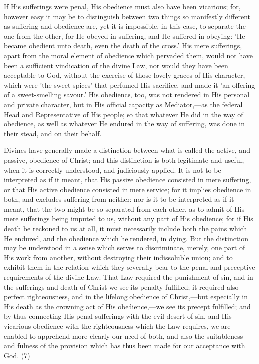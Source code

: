 \documentclass[
]{book}
\begin{document}
If His sufferings were penal, His obedience must also have been vicarious; for, however easy it may be to distinguish between two things so manifestly different as suffering and obedience are, yet it is impossible, in this case, to separate the one from the other, for He obeyed in suffering, and He suffered in obeying: 'He became obedient unto death, even the death of the cross.' His mere sufferings, apart from the moral element of obedience which pervaded them, would not have been a sufficient vindication of the divine Law, nor would they have been acceptable to God, without the exercise of those lovely graces of His character, which were 'the sweet spices' that perfumed His sacrifice, and made it 'an offering of a sweet-smelling savour.' His obedience, too, was not rendered in His personal and private character, but in His official capacity as Mediator,---as the federal Head and Representative of His people; so that whatever He did in the way of obedience, as well as whatever He endured in the way of suffering, was done in their stead, and on their behalf.

Divines have generally made a distinction between what is called the active, and passive, obedience of Christ; and this distinction is both legitimate and useful, when it is correctly understood, and judiciously applied. It is not to be interpreted as if it meant, that His passive obedience consisted in mere suffering, or that His active obedience consisted in mere service; for it implies obedience in both, and excludes suffering from neither: nor is it to be interpreted as if it meant, that the two might be so separated from each other, as to admit of His mere sufferings being imputed to us, without any part of His obedience; for if His death be reckoned to us at all, it must necessarily include both the pains which He endured, and the obedience which he rendered, in dying. But the distinction may be understood in a sense which serves to discriminate, merely, one part of His work from another, without destroying their indissoluble union; and to exhibit them in the relation which they severally bear to the penal and preceptive requirements of the divine Law. That Law required the punishment of sin, and in the sufferings and death of Christ we see its penalty fulfilled; it required also perfect righteousness, and in the lifelong obedience of Christ,---but especially in His death as the crowning act of His obedience,---we see its precept fulfilled; and by thus connecting His penal sufferings with the evil desert of sin, and His vicarious obedience with the righteousness which the Law requires, we are enabled to apprehend more clearly our need of both, and also the suitableness and fulness of the provision which has thus been made for our acceptance with God. (7)
\end{document}
